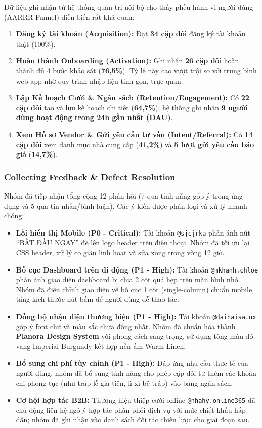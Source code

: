 \documentclass[11pt]{article}
\begin{document}
Dữ liệu ghi nhận từ hệ thống quản trị nội bộ cho thấy phễu hành vi người dùng (AARRR Funnel) diễn biến rất khả quan:
\begin{enumerate}
    \item \textbf{Đăng ký tài khoản (Acquisition):} Đạt \textbf{34 cặp đôi} đăng ký tài khoản thật (100\%).
    \item \textbf{Hoàn thành Onboarding (Activation):} Ghi nhận \textbf{26 cặp đôi} hoàn thành đủ 4 bước khảo sát (\textbf{76,5\%}). Tỷ lệ này cao vượt trội so với trung bình web app nhờ quy trình nhập liệu tinh gọn, trực quan.
    \item \textbf{Lập Kế hoạch Cưới & Ngân sách (Retention/Engagement):} Có \textbf{22 cặp đôi} tạo và lưu kế hoạch chi tiết (\textbf{64,7\%}); hệ thống ghi nhận \textbf{9 người dùng hoạt động trong 24h gần nhất (DAU)}.
    \item \textbf{Xem Hồ sơ Vendor & Gửi yêu cầu tư vấn (Intent/Referral):} Có \textbf{14 cặp đôi} xem danh mục nhà cung cấp (\textbf{41,2\%}) và \textbf{5 lượt gửi yêu cầu báo giá} (\textbf{14,7\%}).
\end{enumerate}

\subsubsection*{Collecting Feedback \& Defect Resolution}
Nhóm đã tiếp nhận tổng cộng 12 phản hồi (7 qua tính năng góp ý trong ứng dụng và 5 qua tin nhắn/bình luận). Các ý kiến được phân loại và xử lý nhanh chóng:
\begin{itemize}
    \item \textbf{Lỗi hiển thị Mobile (P0 - Critical):} Tài khoản \texttt{@sjcjrka} phản ánh nút ``BẮT ĐẦU NGAY'' đè lên logo header trên điện thoại. Nhóm đã tối ưu lại CSS header, xử lý co giãn linh hoạt và sửa xong trong vòng 12 giờ.
    \item \textbf{Bố cục Dashboard trên di động (P1 - High):} Tài khoản \texttt{@mkhanh.chloe} phản ánh giao diện dashboard bị chia 2 cột quá hẹp trên màn hình nhỏ. Nhóm đã điều chỉnh giao diện về bố cục 1 cột (single-column) chuẩn mobile, tăng kích thước nút bấm để người dùng dễ thao tác.
    \item \textbf{Đồng bộ nhận diện thương hiệu (P1 - High):} Tài khoản \texttt{@daihaisa.nx} góp ý font chữ và màu sắc chưa đồng nhất. Nhóm đã chuẩn hóa thành \textbf{Planora Design System} với phong cách sang trọng, sử dụng tông màu đỏ vang Imperial Burgundy kết hợp nền ấm Warm Linen.
    \item \textbf{Bổ sung chi phí tùy chỉnh (P1 - High):} Đáp ứng nhu cầu thực tế của người dùng, nhóm đã bổ sung tính năng cho phép cặp đôi tự thêm các khoản chi phong tục (như tráp lễ gia tiên, lì xì bê tráp) vào bảng ngân sách.
    \item \textbf{Cơ hội hợp tác B2B:} Thương hiệu thiệp cưới online \texttt{@nhahy.online365} đã chủ động liên hệ ngỏ ý hợp tác phân phối dịch vụ với mức chiết khấu hấp dẫn; nhóm đã ghi nhận vào danh sách đối tác chiến lược cho giai đoạn sau.
\end{itemize}
\end{document}

